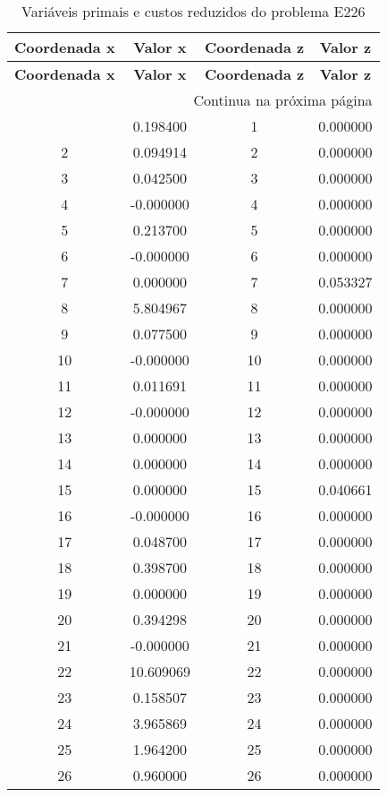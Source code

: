 \documentclass[12pt]{article}
\begin{document}
\begin{longtable}{@{}cccc@{}}
\caption{Variáveis primais e custos reduzidos do problema E226} \\
\toprule
\textbf{Coordenada x} & \textbf{Valor x} & \textbf{Coordenada z} & \textbf{Valor z} \\
\midrule
\endfirsthead

\toprule
\textbf{Coordenada x} & \textbf{Valor x} & \textbf{Coordenada z} & \textbf{Valor z} \\
\midrule
\endhead

\midrule \multicolumn{4}{r}{{Continua na próxima página}} \\ \midrule
\endfoot

\bottomrule
\endlastfoot
1 & 0.198400 & 1 & 0.000000 \\
2 & 0.094914 & 2 & 0.000000 \\
3 & 0.042500 & 3 & 0.000000 \\
4 & -0.000000 & 4 & 0.000000 \\
5 & 0.213700 & 5 & 0.000000 \\
6 & -0.000000 & 6 & 0.000000 \\
7 & 0.000000 & 7 & 0.053327 \\
8 & 5.804967 & 8 & 0.000000 \\
9 & 0.077500 & 9 & 0.000000 \\
10 & -0.000000 & 10 & 0.000000 \\
11 & 0.011691 & 11 & 0.000000 \\
12 & -0.000000 & 12 & 0.000000 \\
13 & 0.000000 & 13 & 0.000000 \\
14 & 0.000000 & 14 & 0.000000 \\
15 & 0.000000 & 15 & 0.040661 \\
16 & -0.000000 & 16 & 0.000000 \\
17 & 0.048700 & 17 & 0.000000 \\
18 & 0.398700 & 18 & 0.000000 \\
19 & 0.000000 & 19 & 0.000000 \\
20 & 0.394298 & 20 & 0.000000 \\
21 & -0.000000 & 21 & 0.000000 \\
22 & 10.609069 & 22 & 0.000000 \\
23 & 0.158507 & 23 & 0.000000 \\
24 & 3.965869 & 24 & 0.000000 \\
25 & 1.964200 & 25 & 0.000000 \\
26 & 0.960000 & 26 & 0.000000 \\

\end{longtable}
\end{document}
